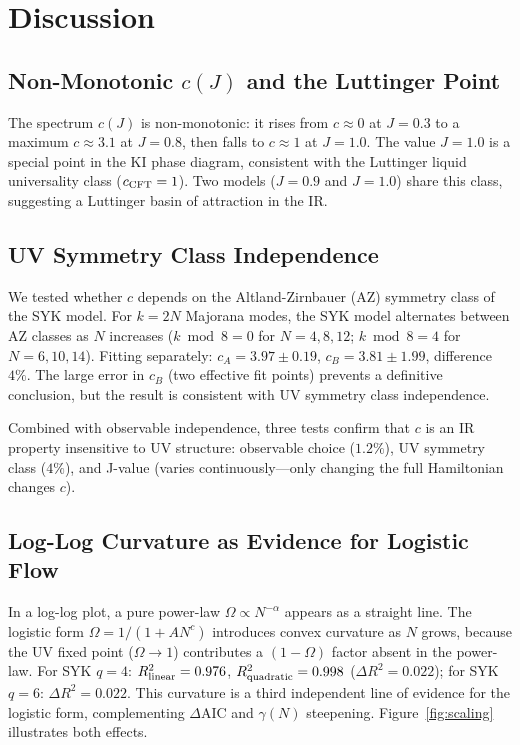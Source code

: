 \documentclass[aps,prl,twocolumn,showpacs,preprintnumbers,superscriptaddress]{revtex4-2}
\begin{document}
\section{Discussion}
\label{sec:discussion}

\subsection{Non-Monotonic $c(J)$ and the Luttinger Point}

The spectrum $c(J)$ is non-monotonic: it rises from $c \approx 0$ at
$J = 0.3$ to a maximum $c \approx 3.1$ at $J = 0.8$, then falls to
$c \approx 1$ at $J = 1.0$.
The value $J = 1.0$ is a special point in the KI phase diagram, consistent
with the Luttinger liquid universality class ($c_{\rm CFT} = 1$).
Two models ($J = 0.9$ and $J = 1.0$) share this class, suggesting a
Luttinger basin of attraction in the IR.

\subsection{UV Symmetry Class Independence}

We tested whether $c$ depends on the Altland-Zirnbauer (AZ) symmetry
class of the SYK model.
For $k = 2N$ Majorana modes, the SYK model alternates between AZ classes
as $N$ increases ($k \bmod 8 = 0$ for $N = 4, 8, 12$; $k \bmod 8 = 4$
for $N = 6, 10, 14$).
Fitting separately: $c_A = 3.97 \pm 0.19$, $c_B = 3.81 \pm 1.99$,
difference $4\%$.
The large error in $c_B$ (two effective fit points) prevents a definitive
conclusion, but the result is consistent with UV symmetry class independence.

Combined with observable independence, three tests confirm that $c$ is
an IR property insensitive to UV structure:
observable choice ($1.2\%$), UV symmetry class ($4\%$), and J-value
(varies continuously---only changing the full Hamiltonian changes $c$).

\subsection{Log-Log Curvature as Evidence for Logistic Flow}

In a log-log plot, a pure power-law $\Omega \propto N^{-\alpha}$ appears
as a straight line.
The logistic form $\Omega = 1/(1 + AN^c)$ introduces convex curvature
as $N$ grows, because the UV fixed point ($\Omega \to 1$) contributes
a $(1-\Omega)$ factor absent in the power-law.
For SYK $q = 4$: $R^2_{\rm linear} = 0.976$, $R^2_{\rm quadratic} = 0.998$
($\Delta R^2 = 0.022$); for SYK $q = 6$: $\Delta R^2 = 0.022$.
This curvature is a third independent line of evidence for the logistic
form, complementing $\Delta\text{AIC}$ and $\gamma(N)$ steepening.
Figure~\ref{fig:scaling} illustrates both effects.
\end{document}
